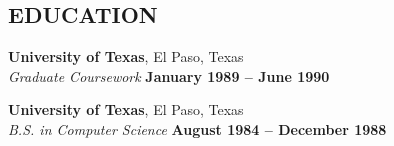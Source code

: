 \documentclass[margin,line]{resume}
\begin{document}
\begin{resume}
\sectionline


    \section{\mysidestyle \textbf{\large{E}\small{DUCATION}}}

    \textbf{\listing University of Texas}, El Paso, Texas \vspace{1mm}\\
    \textsl{Graduate Coursework} \hfill \textbf{January 1989 -- June 1990}\vspace{-3mm}\\\vspace{-1mm}%

    \textbf{\listing University of Texas}, El Paso, Texas \vspace{1mm}\\
    \textsl{B.S. in Computer Science} \hfill \textbf{August 1984 -- December 1988}\vspace{-3mm}\\\vspace{-1mm}%

    \vspace{-1mm}


\end{resume}
\end{document}
